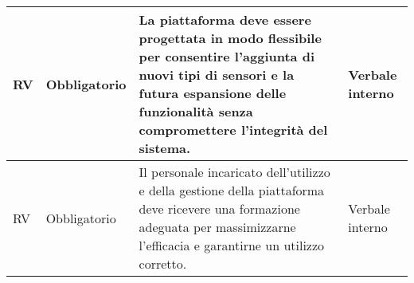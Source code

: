 \begin{longtable}{|C{1cm}|C{2cm}|>{\raggedright}m{5cm}|C{2cm}|}
    \hline
     RV & Obbligatorio        & La piattaforma deve essere progettata in modo flessibile per consentire l'aggiunta di nuovi tipi di sensori e la futura espansione delle funzionalità senza compromettere l'integrità del sistema. & Verbale interno \\
    \hline
     RV & Obbligatorio        & Il personale incaricato dell'utilizzo e della gestione della piattaforma deve ricevere una formazione adeguata per massimizzarne l'efficacia e garantirne un utilizzo corretto.                    & Verbale interno \\
    \hline
\end{longtable}



